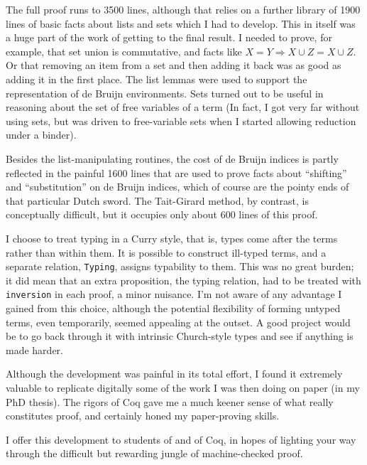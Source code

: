 \documentclass{tufte-handout}
\begin{document}
The full proof runs to 3500 lines,
 although that relies on a further library of 1900 lines of basic facts about lists and sets which I had to develop. This in itself was a huge part of the work of getting to the final result. I needed to prove, for example, that set union is commutative, and facts like $X = Y \Rightarrow X \cup Z = X \cup Z$. Or that removing an item from a set and then adding it back was as good as adding it in the first place. The list lemmas were used to support the representation of de Bruijn environments. Sets turned out to be useful in reasoning about the set of free variables of a term (In fact, I got very far without using sets, but was driven to free-variable sets when I started allowing reduction under a binder).

Besides the list-manipulating routines, the cost of de Bruijn indices is partly reflected in the painful 1600 lines that are used to prove facts about ``shifting'' and ``substitution'' on de Bruijn indices, which of course are the pointy ends of that particular Dutch sword. The Tait-Girard method, by contrast, is conceptually difficult, but it occupies only about 600 lines of this proof.

I choose to treat typing in a Curry style, that is, types come after the terms rather than within them. It is possible to construct ill-typed terms, and a separate relation, \verb|Typing|,  assigns typability to them. This was no great burden; it did mean that an extra proposition, the typing relation, had to be treated with \verb|inversion| in each proof, a minor nuisance. I'm not aware of any advantage I gained from this choice, although the potential flexibility of forming untyped terms, even temporarily, seemed appealing at the outset. A good project would be to go back through it with intrinsic Church-style types and see if anything is made harder.

Although the development was painful in its total effort, I found it extremely valuable to replicate digitally some of the work I was then doing on paper (in my PhD thesis). The rigors of Coq gave me a much keener sense of what really constitutes proof, and certainly honed my paper-proving skills.

I offer this development to students of \STLC{} and of Coq, in hopes of lighting your way through the difficult but rewarding jungle of machine-checked proof.
\end{document}
